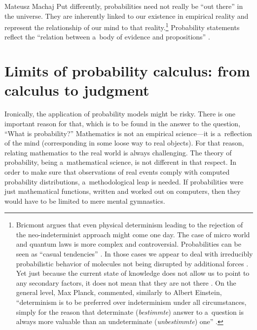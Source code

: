 \begin{artengenv}{Mateusz Machaj}
Put differently, probabilities need not really be ``out there'' in the universe. They are inherently linked to our existence in empirical reality and represent the relationship of our mind to that reality.\footnote{Bricmont 
\parencite*[][]{bricmont_determinism_2002} %
 argues that even physical determinism leading to the rejection of the neo-indeterminist approach might come one day. The case of micro world and quantum laws is more complex and controversial. Probabilities can be seen as ``casual tendencies'' 
\parencite[][p.295]{shanks_time_1993}. %
 In those cases we appear to deal with irreducibly probabilistic behavior of molecules not being disrupted by additional forces 
\parencite[][p.372]{fetzer_probability_1983}. %
 Yet just because the current state of knowledge does not allow us to point to any secondary factors, it does not mean that they are not there 
\parencite[][p.373]{fetzer_probability_1983}. %
 On the general level, Max Planck, commented, similarly to Albert Einstein, ``determinism is to be preferred over indeterminism under all circumstances, simply for the reason that determinate (\textit{bestimmte}) answer to a~question is always more valuable than an undeterminate (\textit{unbestimmte}) one'' 
\parencite[quoted in][p.281]{kruger_probability_1986}.%
} Probability statements reflect the ``relation between a~body of evidence and propositions'' 
\parencite[][p.232]{moser_foundations_1988}.%




\section{Limits of probability calculus: from calculus to judgment}

Ironically, the application of probability models might be risky. There is one important reason for that, which is to be found in the answer to the question, ``What is probability?'' Mathematics is not an empirical science---it is a~reflection of the mind (corresponding in some loose way to real objects). For that reason, relating mathematics to the real world is always challenging. The theory of probability, being a~mathematical science, is not different in that respect. In order to make sure that observations of real events comply with computed probability distributions, a~methodological leap is needed. If probabilities were just mathematical functions, written and worked out on computers, then they would have to be limited to mere mental gymnastics.




\end{artengenv}

